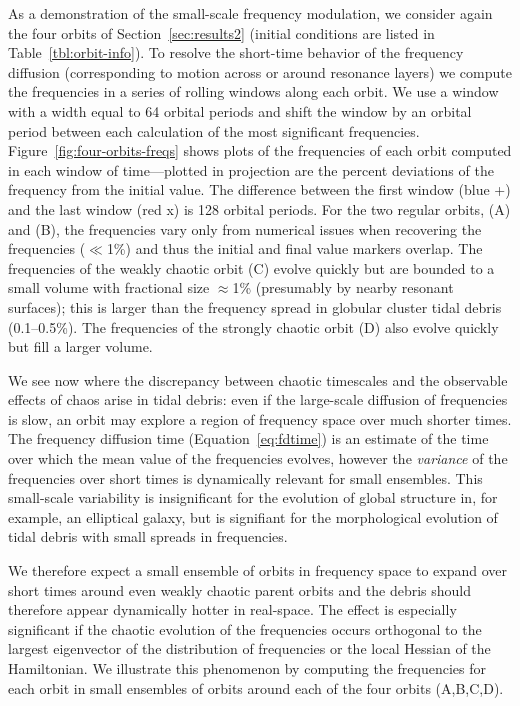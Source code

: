 \documentclass[letterpaper,12pt,preprint]{aastex}
\begin{document}
As a demonstration of the small-scale frequency modulation, we consider again the four orbits of Section~\ref{sec:results2} (initial conditions are listed in Table~\ref{tbl:orbit-info}). To resolve the short-time behavior of the frequency diffusion (corresponding to motion across or around resonance layers) we compute the frequencies in a series of rolling windows along each orbit. We use a window with a width equal to 64 orbital periods and shift the window by an orbital period between each calculation of the most significant frequencies. Figure~\ref{fig:four-orbits-freqs} shows plots of the frequencies of each orbit computed in each window of time---plotted in projection are the percent deviations of the frequency from the initial value. The difference between the first window (blue +) and the last window (red x) is 128 orbital periods. For the two regular orbits, (A) and (B), the frequencies vary only from numerical issues when recovering the frequencies ($\ll$1\%) and thus the initial and final value markers overlap. The frequencies of the weakly chaotic orbit (C) evolve quickly but are bounded to a small volume with fractional size $\approx$1\% (presumably by nearby resonant surfaces); this is larger than the frequency spread in globular cluster tidal debris (0.1--0.5\%). The frequencies of the strongly chaotic orbit (D) also evolve quickly but fill a larger volume.

We see now where the discrepancy between chaotic timescales and the observable effects of chaos arise in tidal debris: even if the large-scale diffusion of frequencies is slow, an orbit may explore a region of frequency space over much shorter times. The frequency diffusion time (Equation~\ref{eq:fdtime}) is an estimate of the time over which the mean value of the frequencies evolves, however the \emph{variance} of the frequencies over short times is dynamically relevant for small ensembles. This small-scale variability is insignificant for the evolution of global structure in, for example, an elliptical galaxy, but is signifiant for the morphological evolution of tidal debris with small spreads in frequencies. 

We therefore expect a small ensemble of orbits in frequency space to expand over short times around even weakly chaotic parent orbits and the debris should therefore appear dynamically hotter in real-space. The effect is especially significant if the chaotic evolution of the frequencies occurs orthogonal to the largest eigenvector of the distribution of frequencies or the local Hessian of the Hamiltonian. We illustrate this phenomenon by computing the frequencies for each orbit in small ensembles of orbits around each of the four orbits (A,B,C,D). 
\end{document}
